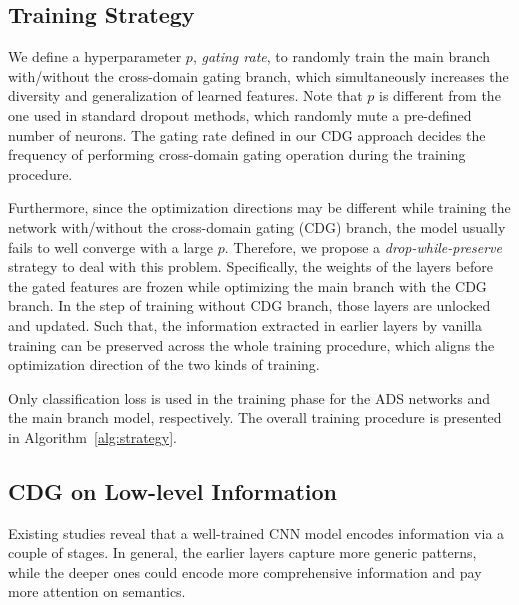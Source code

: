 \subsection{Training Strategy}
\label{sec:strategy}


We define a hyperparameter $p$, \ie \textit{gating rate}, to randomly train the main branch with/without the cross-domain gating branch, which simultaneously increases the diversity and generalization of learned features. Note that $p$ is different from the one used in standard dropout methods, which randomly mute a pre-defined number of neurons. The gating rate defined in our CDG approach decides the frequency of performing cross-domain gating operation during the training procedure.

Furthermore, since the optimization directions may be different while training the network with/without the cross-domain gating (CDG) branch, the model usually fails to well converge with a large $p$. Therefore, we propose a \textit{drop-while-preserve} strategy to deal with this problem. Specifically, the weights of the layers before the gated features are frozen while optimizing the main branch with the CDG branch. In the step of training without CDG branch, those layers are unlocked and updated. Such that, the information extracted in earlier layers by vanilla training can be preserved across the whole training procedure, which aligns the optimization direction of the two kinds of training. 

Only classification loss is used in the training phase for the ADS networks and the main branch model, respectively. The overall training procedure is presented in Algorithm~\ref{alg:strategy}. 



\subsection{CDG on Low-level Information}
\label{sec:low-level}
Existing studies reveal that a well-trained CNN model encodes information via a couple of stages. In general, the earlier layers capture more generic patterns, while the deeper ones could encode more comprehensive information and pay more attention on semantics. 


